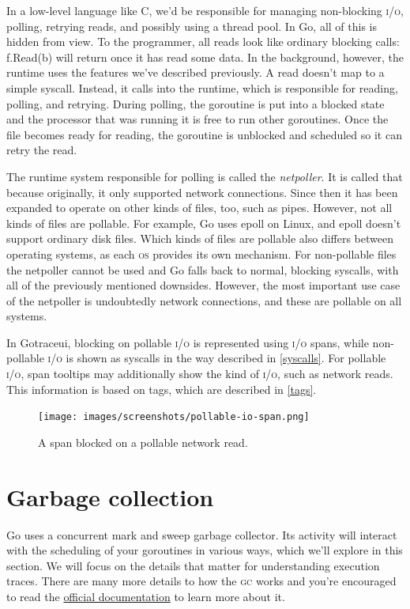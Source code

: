 \documentclass[10pt,letterpaper,oneside,openany,english]{memoir}
\newcommand{\code}[1]{{\ttfamily\mbox{#1}}}
\begin{document}
In a low-level language like C, we'd be responsible for managing non-blocking \textsc{i/o}, polling, retrying reads, and possibly using a thread pool.
In Go, all of this is hidden from view. To the programmer, all reads look like ordinary blocking calls: \code{f.Read(b)} will return once it has read some data.
In the background, however, the runtime uses the features we've described previously.
A read doesn't map to a simple syscall. Instead, it calls into the runtime, which is responsible for reading, polling, and retrying.
During polling, the goroutine is put into a blocked state and the processor that was running it is free to run other goroutines.
Once the file becomes ready for reading, the goroutine is unblocked and scheduled so it can retry the read.

The runtime system responsible for polling is called the \emph{netpoller}. It is called that because originally, it only supported network connections.
Since then it has been expanded to operate on other kinds of files, too, such as pipes.
However, not all kinds of files are pollable. For example, Go uses epoll on Linux, and epoll doesn't support ordinary disk files.
Which kinds of files are pollable also differs between operating systems, as each \textsc{os} provides its own mechanism.
For non-pollable files the netpoller cannot be used and Go falls back to normal, blocking syscalls, with all of the previously mentioned downsides.
However, the most important use case of the netpoller is undoubtedly network connections, and these are pollable on all systems.

In Gotraceui, blocking on pollable \textsc{i/o} is represented using \textsc{i/o} spans, while non-pollable \textsc{i/o} is shown as syscalls in the way described in \cref{syscalls}.
For pollable \textsc{i/o}, span tooltips may additionally show the kind of \textsc{i/o}, such as network reads. This information is based on tags, which are described in \cref{tags}.

\begin{figure}[h]
  \centering
  \texttt{[image: images/screenshots/pollable-io-span.png]}
  \caption{A span blocked on a pollable network read.}
\end{figure}

\section{Garbage collection}\label{gc}
Go uses a concurrent mark and sweep garbage collector.
Its activity will interact with the scheduling of your goroutines in various ways,
which we'll explore in this section.
We will focus on the details that matter for understanding execution traces.
There are many more details to how the \textsc{gc} works
and you're encouraged to read the \href{https://go.dev/doc/gc-guide}{official documentation}\cite{GuideGoGarbage} to learn more about it.
\end{document}
